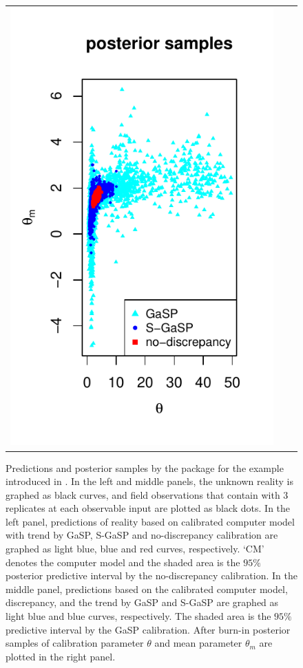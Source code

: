 \begin{figure}[t]
\begin{tabular}{ccc}
		\hspace{-.3in} 	\includegraphics[scale=.7]{figures/Bayarri_2007_post_samples.pdf}
\end{tabular}
   \caption{Predictions and posterior samples by the  package for the example introduced in \cite{bayarri2007framework}. In the left and middle panels, the unknown reality is graphed as black curves, and field observations that contain with 3 replicates at each observable input are plotted as black {dots}.  In the left panel, predictions of reality based on calibrated computer model with trend by GaSP, S-GaSP and no-discrepancy calibration are graphed as light blue, blue and red curves, respectively. `CM'  denotes the computer model and the shaded area is the $95\%$ posterior predictive interval by the no-discrepancy calibration.  In the middle panel, predictions based on the calibrated computer model, discrepancy, and the trend by GaSP and S-GaSP are graphed as light blue and blue curves, respectively. The shaded area is the  $95\%$  predictive interval by the GaSP calibration.  After burn-in posterior samples of calibration parameter $\theta$ and mean parameter $\theta_m$  are plotted in the right panel.  }

 \label{fig:bayarri_2007}
\end{figure}





